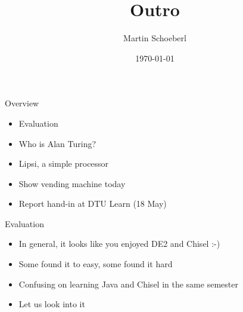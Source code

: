 

\newif\ifbook


\title{Outro}
\author{Martin Schoeberl}
\date{\today}



\begin{frame}
\titlepage
\end{frame}


\begin{frame}[fragile]{Overview}
\begin{itemize}
\item Evaluation
\item Who is Alan Turing?
\item Lipsi, a simple processor
\item Show vending machine today
\item Report hand-in at DTU Learn (18 May)
\end{itemize}
\end{frame}




\begin{frame}[fragile]{Evaluation}
\begin{itemize}
\item In general, it looks like you enjoyed DE2 and Chisel :-)
\item Some found it to easy, some found it hard
\item Confusing on learning Java and Chisel in the same semester
\item Let us look into it
\end{itemize}
\end{frame}

